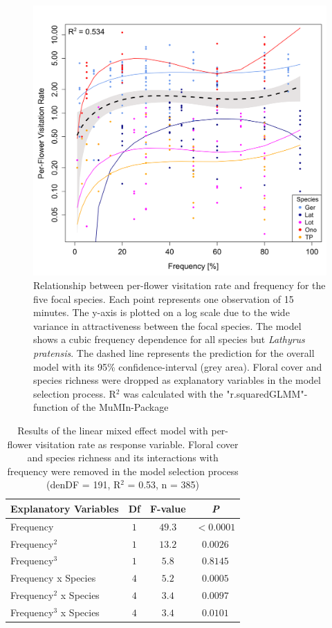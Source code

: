 \begin{figure} [!th] %
	\centering
	\includegraphics[width=14cm]{Images/LME}
	\caption{Relationship between per-flower visitation rate and frequency for the five focal species. Each point represents one observation of 15 minutes. The y-axis is plotted on a log scale due to the wide variance in attractiveness between the focal species. The model shows a cubic frequency dependence for all species but \textit{Lathyrus pratensis}. The dashed line represents the prediction for the overall model with its 95\% confidence-interval (grey area). Floral cover and species richness were dropped as explanatory variables in the model selection process. R$^{2}$ was calculated with the "r.squaredGLMM"-function of the MuMIn-Package \citep{MuMIn}}
	\label{fig:LME}
\end{figure}

\begin{table} [!htbp] %
	\centering
	\caption{Results of the linear mixed effect model with per-flower visitation rate as response variable. Floral cover and species richness and its interactions with frequency were removed in the model selection process (denDF = 191, R$^{2}$ = 0.53, n = 385)}
	\begin{tabular} { l c c c}
		\toprule
		\textbf{Explanatory Variables} & \textbf{Df} & \textbf{F-value} & \textbf{\textit{P}} \\
		\midrule
		Frequency 			&  $1$ & $49.3$ & $<0.0001$ \\
		Frequency$^{2}$ 		&  $1$ & $13.2$ & $0.0026$ \\
		Frequency$^{3}$ 		&  $1$ & $ 5.8$ &  $0.8145$ \\
	    Frequency x Species &  $4$ & $ 5.2$ &  $0.0005$ \\
		Frequency$^{2}$ x Species & $4$ & $3.4$ & $0.0097$\\
		Frequency$^{3}$ x Species & $4$ & $3.4$ & $0.0101$\\
		\bottomrule
	\end{tabular}
	\label{tab:anova}
\end{table}
